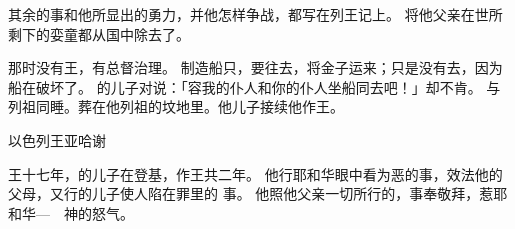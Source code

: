 {\par }{\PP {}其余的事和他所显出的勇力，并他怎样争战，都写在{}列王记上。
将他父亲{}在世所剩下的娈童都从国中除去了。
\par }{\PP {}那时{}没有王，有总督治理。
制造{}船只，要往{}去，将金子运来；只是没有去，因为船在{}破坏了。
的儿子{}对{}说：「容我的仆人和你的仆人坐船同去吧！」{}却不肯。
与列祖同睡。葬在{}他列祖的坟地里。他儿子{}接续他作王。
\par }{\SH 以色列王亚哈谢
\par }{\PP {}王{}十七年，{}的儿子{}在{}登基，作{}王共二年。
他行耶和华眼中看为恶的事，效法他的父母，又行{}的儿子{}使{}人陷在罪里的 事。
他照他父亲一切所行的，事奉敬拜{}，惹耶和华—{}　神的怒气。
\par }